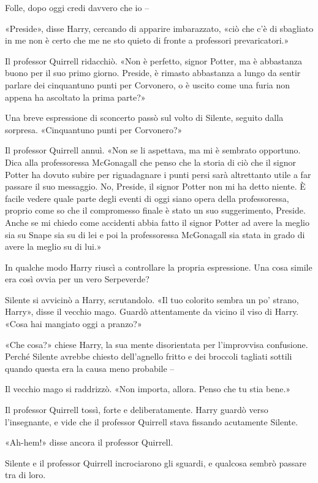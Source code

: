 Folle, dopo oggi credi davvero che io –

«Preside», disse Harry, cercando di apparire imbarazzato, «ciò che c’è di sbagliato in me non è certo che me ne sto quieto di fronte a professori prevaricatori.»

Il professor Quirrell ridacchiò. «Non è perfetto, signor Potter, ma è abbastanza buono per il suo primo giorno. Preside, è rimasto abbastanza a lungo da sentir parlare dei cinquantuno punti per Corvonero, o è uscito come una furia non appena ha ascoltato la prima parte?»

Una breve espressione di sconcerto passò sul volto di Silente, seguito dalla sorpresa. «Cinquantuno punti per Corvonero?»

Il professor Quirrell annuì. «Non se li aspettava, ma mi è sembrato opportuno. Dica alla professoressa McGonagall che penso che la storia di ciò che il signor Potter ha dovuto subire per riguadagnare i punti persi sarà altrettanto utile a far passare il suo messaggio. No, Preside, il signor Potter non mi ha detto niente. È facile vedere quale parte degli eventi di oggi siano opera della professoressa, proprio come so che il compromesso finale è stato un suo suggerimento, Preside. Anche se mi chiedo come accidenti abbia fatto il signor Potter ad avere la meglio sia su Snape sia su di lei e poi la professoressa McGonagall sia stata in grado di avere la meglio su di lui.»

In qualche modo Harry riuscì a controllare la propria espressione. Una cosa simile era così ovvia per un vero Serpeverde?

Silente si avvicinò a Harry, scrutandolo. «Il tuo colorito sembra un po’ strano, Harry», disse il vecchio mago. Guardò attentamente da vicino il viso di Harry. «Cosa hai mangiato oggi a pranzo?»

«Che cosa?» chiese Harry, la sua mente disorientata per l’improvvisa confusione. Perché Silente avrebbe chiesto dell’agnello fritto e dei broccoli tagliati sottili quando questa era la causa meno probabile –

Il vecchio mago si raddrizzò. «Non importa, allora. Penso che tu stia bene.»

Il professor Quirrell tossì, forte e deliberatamente. Harry guardò verso l’insegnante, e vide che il professor Quirrell stava fissando acutamente Silente.

«Ah-hem!» disse ancora il professor Quirrell.

Silente e il professor Quirrell incrociarono gli sguardi, e qualcosa sembrò passare tra di loro.

